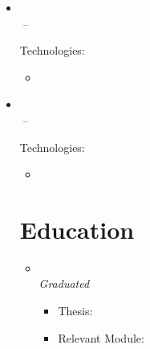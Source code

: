 \documentclass[11pt,a4paper]{article}
\begin{document}
\begin{itemize}[leftmargin=0pt,label={},itemsep=2em,topsep=0pt]
\item \parbox{\textwidth}{\textbf{\HSBCName} \hfill \textit{\HSBCLocation}}\\
\textit{\HSBCJobTitle} \hfill \textit{\HSBCJobStart\,--\,\HSBCJobEnd}

\vspace{0.2cm}
{\color{secondary}Technologies:} \HSBCTechnology
\vspace{0.3cm}
\begin{itemize}[leftmargin=*,topsep=-6pt,parsep=0pt,partopsep=0pt,itemsep=0pt]
    \item \HSBCShort
\end{itemize}


\item \parbox{\textwidth}{\textbf{\LloydsName} \hfill \textit{\LloydsLocation}}\\
\textit{\LloydsJobTitle} \hfill \textit{\LloydsJobStart\,--\,\LloydsJobEnd}

\vspace{0.2cm}
{\color{secondary}Technologies:} \LloydsTechnology
\vspace{0.3cm}
\begin{itemize}[leftmargin=*,topsep=-6pt,parsep=0pt,partopsep=0pt,itemsep=0pt]
    \item \LloydsShort
\end{itemize}



\vspace{0.5cm}
\section{Education}
\begin{itemize}[leftmargin=0pt,label={},itemsep=2em]
\item \parbox{\textwidth}{\textbf{\MasterUniversity} \hfill \textit{\MasterLocation}}\\
\textit{\MasterCourse} \hfill \textit{Graduated \MasterGraduation}\\[4pt]

\begin{itemize}[label={--},leftmargin=*,topsep=0pt,parsep=0pt,partopsep=0pt]
    \item {\color{secondary}Thesis:} \textit{\MastersThesisTitle}\\
    \MastersThesisDescription
    \item {\color{secondary}Relevant Module:} \textit{\MastersNotableJavaModule}\\
\end{itemize}


\end{itemize}
\end{itemize}
\end{document}
